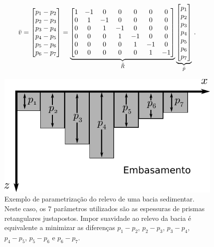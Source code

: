 \begin{equation}
\bar{v} =
    \begin{bmatrix}
    p_1 - p_2 \\ p_2 - p_3 \\ p_3 - p_4 \\ p_4 - p_5 \\ p_5 - p_6 \\ p_6 - p_7
    \end{bmatrix}
    =
    \underbrace{
    \begin{bmatrix}
    1 & -1 & 0 & 0 & 0 & 0 & 0\\
    0 & 1 & -1 & 0 & 0 & 0 & 0\\    
    0 & 0 & 1 & -1 & 0 & 0 & 0\\    
    0 & 0 & 0 & 1 & -1 & 0 & 0\\    
    0 & 0 & 0 & 0 & 1 & -1 & 0\\    
    0 & 0 & 0 & 0 & 0 & 1 & -1\\    
    \end{bmatrix}}_{\bar{\bar{R}}}    
    \underbrace{
    \begin{bmatrix}
    p_1 \\ p_2 \\ p_3 \\ p_4 \\ p_5 \\ p_6 \\ p_7
    \end{bmatrix}}_{\bar{p}}    
     \thinspace .
\end{equation}

\begin{figure}
    \centering
    \includegraphics[scale=1]{figs/basin-smoothness}
    \caption{Exemplo de parametrização do relevo de uma bacia sedimentar.
    Neste caso, os 7 parâmetros utilizados são as espessuras de prismas
    retangulares justapostos. Impor suavidade ao relevo da bacia é equivalente
    a minimizar as diferenças $p_1 - p_2$, $p_2 - p_3$, $p_3 - p_4$, $p_4 - p_5$,
    $p_5 - p_6$ e $p_6 - p_7$.}
    \label{fig:basin-smoothness}
\end{figure}

